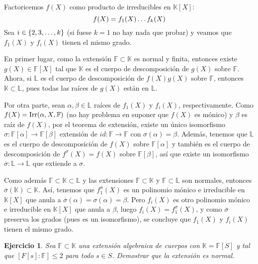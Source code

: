 \documentclass[11pt]{report}
\makeatletter
\renewenvironment{proof}[1][\proofname]{\par
  \pushQED{\qed}%
  \normalfont \topsep\z@skip %
  \trivlist
  \item[\hskip\labelsep
        \itshape
    #1\@addpunct{.}]\ignorespaces
}{%
  \popQED\endtrivlist\@endpefalse
}
\newcommand{\F}{\mathbb F}
\newcommand{\K}{\mathbb K}
\renewcommand{\L}{\mathbb L}
\newtheorem{ejercicio}{Ejercicio}
\makeatother
\begin{document}
\begin{proof}
Factoricemos $f(X)$ como producto de irreducibles en $\K[X]$:
\[f(X)=f_1(X)\mathellipsis f_k(X)\]
Sea $i \in \{2,3,\mathellipsis,k\}$ (si fuese $k = 1$ no hay nada que probar) y veamos que $f_1(X)$ y $f_i(X)$ tienen el mismo grado.

En primer lugar, como la extensión $\F \subset \K$ es normal y finita, entonces existe $g(X) \in \F[X]$ tal que $\K$ es el cuerpo de descomposición de $g(X)$ sobre $\F$. Ahora, si $\L$ es el cuerpo de descomposición de $f(X)g(X)$ sobre $\F$, entonces $\K \subset \L$, pues todas las raíces de $g(X)$ están en $\L$.

Por otra parte, sean $\alpha,\beta \in \L$ raíces de $f_1(X)$ y $f_i(X)$, respectivamente. Como $f(X) = \textup{Irr}(\alpha,X,\F)$ (no hay problema en suponer que $f(X)$ es mónico) y $\beta$ es raíz de $f(X)$, por el teorema de extensión, existe un único isomorfismo $\sigma \colon \F[\alpha] \to \F[\beta]$ extensión de $id \colon \F \to \F$ con $\sigma(\alpha) = \beta$. Además, tenemos que $\L$ es el cuerpo de descomposición de $f(X)$ sobre $\F[\alpha]$ y también es el cuerpo de descomposición de $f^\sigma(X)=f(X)$ sobre $\F[\beta]$, así que existe un isomorfismo $\overline{\sigma} \colon \L \to \L$ que extiende a $\sigma$.

\begin{center}
\end{center}

Como además $\F \subset \K \subset \L$ y las extensiones $\F \subset \K$ y $\F \subset \L$ son normales, entonces $\overline{\sigma}(\K) \subset \K$. Así, tenemos que $f^{\overline{\sigma}}_1(X)$ es un polinomio mónico e irreducible en $\K[X]$ que anula a $\overline{\sigma}(\alpha) = \sigma(\alpha) = \beta$. Pero $f_i(X)$ es otro polinomio mónico e irreducible en $\K[X]$ que anula a $\beta$, luego $f_i(X) = f_1^{\overline{\sigma}}(X)$, y como $\overline{\sigma}$ preserva los grados (pues es un isomorfismo), se concluye que $f_1(X)$ y $f_i(X)$ tienen el mismo grado.
\end{proof}

\begin{ejercicio}
Sea $\F \subset \K$ una extensión algebraica de cuerpos con $\K=\F[S]$ y tal que $[F[s] \colon \F] \leq 2$ para todo $s \in S$. Demostrar que la extensión es normal.
\end{ejercicio}
\end{document}
